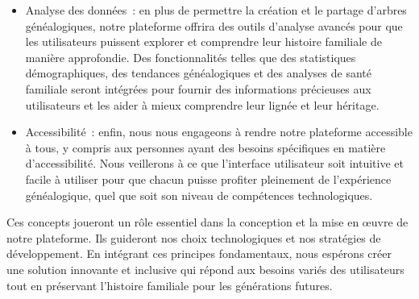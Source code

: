 \begin{itemize}
  \item Analyse des données : en plus de permettre la création et le partage
    d’arbres généalogiques, notre plateforme offrira des outils d’analyse avancés
    pour que les utilisateurs puissent explorer et comprendre leur histoire familiale
    de manière approfondie. Des fonctionnalités telles que des statistiques
    démographiques, des tendances généalogiques et des analyses de santé familiale
    seront intégrées pour fournir des informations précieuses aux utilisateurs et
    les aider à mieux comprendre leur lignée et leur héritage.

  \item Accessibilité : enfin, nous nous engageons à rendre notre plateforme
    accessible à tous, y compris aux personnes ayant des besoins spécifiques en
    matière d’accessibilité. Nous veillerons à ce que l’interface utilisateur soit
    intuitive et facile à utiliser pour que chacun puisse profiter pleinement de
    l’expérience généalogique, quel que soit son niveau de compétences technologiques.

\end{itemize}

Ces concepts joueront un rôle essentiel dans la conception et la mise en œuvre
de notre plateforme. Ils guideront nos choix technologiques et nos stratégies de
développement. En intégrant ces principes fondamentaux, nous espérons créer une
solution innovante et inclusive qui répond aux besoins variés des utilisateurs
tout en préservant l’histoire familiale pour les générations futures.
